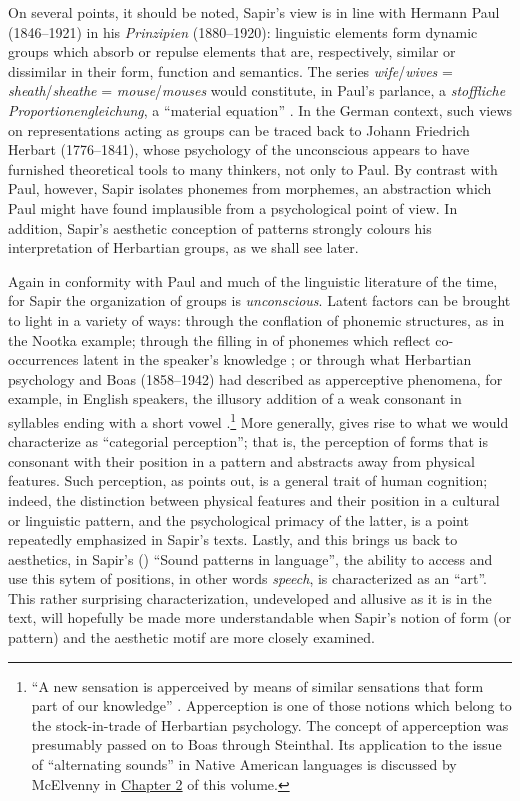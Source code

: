 \documentclass[output=paper]{langscibook}
\begin{document}
On several points, it should be noted, Sapir's view is in line with Hermann Paul (1846--1921) in his \emph{Prinzipien} (1880--1920): linguistic elements form dynamic groups which absorb or repulse elements that are, respectively, similar or dissimilar in their form, function and semantics. The series \emph{wife}/\emph{wives} = \emph{sheath}/\emph{sheathe} = \emph{mouse}/\emph{mouses} would constitute, in Paul's parlance, a \emph{stoffliche Proportionengleichung}, a ``material equation'' \citep[86]{Paul1880}. In the German context, such views on representations acting as groups can be traced back to Johann Friedrich Herbart (1776--1841), whose psychology of the unconscious appears to have furnished theoretical tools to many thinkers, not only to Paul. By contrast with Paul, however, Sapir isolates phonemes from morphemes, an abstraction which Paul might have found implausible from a psychological point of view. In addition, Sapir's aesthetic conception of patterns strongly colours his interpretation of Herbartian groups, as we shall see later.

Again in conformity with Paul and much of the linguistic literature of the time, for Sapir the organization of groups is \emph{unconscious}. Latent factors can be brought to light in a variety of ways: through the conflation of phonemic structures, as in the Nootka example; through the filling in of phonemes which reflect co-occurrences latent in the speaker’s knowledge \citep[52--53]{Sapir1933}; or through what Herbartian psychology and Boas (1858--1942) had described as apperceptive phenomena, for example, in English speakers, the illusory addition of a weak consonant in syllables ending with a short vowel \citep[58--59]{Sapir1933}.\footnote{``A new sensation is apperceived by means of similar sensations that form part of our knowledge'' \citep[50]{Boas1889}. Apperception is one of those notions which belong to the stock-in-trade of Herbartian psychology. The concept of apperception was presumably passed on to Boas through Steinthal. Its application to the issue of ``alternating sounds'' in Native American languages is discussed by McElvenny in \hyperref[chap:mcelvenny]{Chapter 2} of this volume.} More generally,  gives rise to what we would characterize as ``categorial perception''; that is, the perception of forms that is consonant with their position in a pattern and abstracts away from physical features. Such perception, as \citet[46]{Sapir1933} points out, is a general trait of human cognition; indeed, the distinction between physical features and their position in a cultural or linguistic pattern, and the psychological primacy of the latter, is a point repeatedly emphasized in Sapir's texts. Lastly, and this brings us back to aesthetics, in Sapir's (\citeyear{Sapir1925}) ``Sound patterns in language'', the ability to access and use this sytem of positions, in other words \emph{speech}, is characterized as an ``art''. This rather surprising characterization, undeveloped and allusive as it is in the text, will hopefully be made more understandable when Sapir's notion of form (or pattern) and the aesthetic motif are more closely examined.
\end{document}

